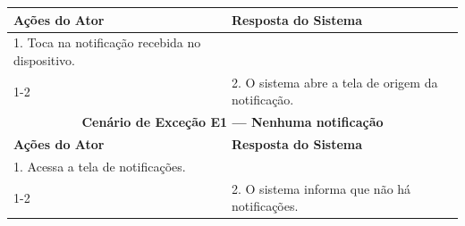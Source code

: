 \begin{longtable}{| p{} | p{} |}
\textbf{Ações do Ator} &
\textbf{Resposta do Sistema} \\
\hline

1. Toca na notificação recebida no dispositivo. & \\
\cline{1-2}

&
2. O sistema abre a tela de origem da notificação. \\
\hline

\multicolumn{2}{|c|}{\textbf{Cenário de Exceção E1 --- Nenhuma notificação}}\\
\hline

\textbf{Ações do Ator} &
\textbf{Resposta do Sistema} \\
\hline

1. Acessa a tela de notificações. & \\
\cline{1-2}

&
2. O sistema informa que não há notificações. \\
\hline

\end{longtable}
